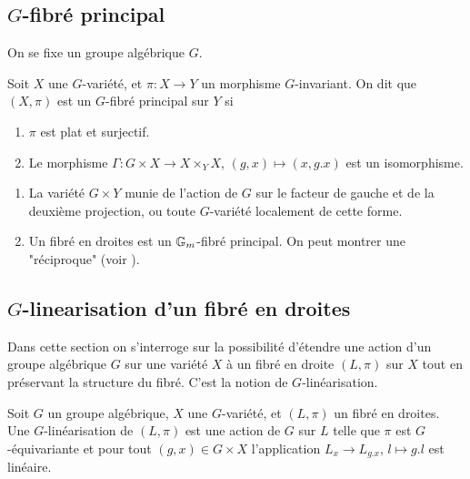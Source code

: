 \subsection{$G$-fibré principal}

\noindent On se fixe un groupe algébrique $G$.

\begin{defn}\label{GPrincipalBundleDef}
Soit $X$ une $G$-variété, et $\pi:X\rightarrow Y$ un morphisme $G$-invariant. On dit que $(X,\pi)$ est un $G$-fibré principal sur $Y$ si
\begin{enumerate}
\item $\pi$ est plat et surjectif.
\item Le morphisme $\Gamma:G\times X\rightarrow X\times_Y X$, $(g,x)\mapsto (x,g.x)$ est un isomorphisme.
\end{enumerate}
\end{defn}

\begin{ex}
\begin{enumerate}
\item La variété $G\times Y$ munie de l'action de $G$ sur le facteur de gauche et de la deuxième projection, ou toute $G$-variété localement de cette forme.
\item Un fibré en droites est un $\mathbb{G}_m$-fibré principal. On peut montrer une "réciproque" (voir \cite[3.1.3]{LinearizationGBrion}).
\end{enumerate}
\end{ex}

\subsection{$G$-linearisation d'un fibré en droites}

Dans cette section on s'interroge sur la possibilité d'étendre une action d'un groupe algébrique $G$ sur une variété $X$ à un fibré en droite $(L,\pi)$ sur $X$ tout en préservant la structure du fibré. C'est la notion de $G$-linéarisation. 

\begin{defn}[$G$-linéarisation]
Soit $G$ un groupe algébrique, $X$ une $G$-variété, et $(L,\pi)$ un fibré en droites. Une $G$-linéarisation de  $(L,\pi)$ est une action de $G$ sur $L$ telle que $\pi$ est $G$-équivariante et pour tout $(g,x)\in G\times X$ l'application $L_x\rightarrow L_{g.x},\, l\mapsto g.l$ est linéaire.
\end{defn}

